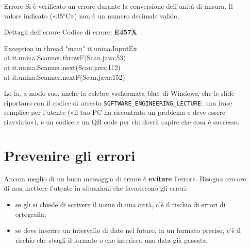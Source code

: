 \begin{center}
\begin{minipage}[t]{0.44\linewidth}\centering
  \begin{finestra}{Errore}
    Si è verificato un errore durante la conversione dell'unità di misura. Il valore indicato («35°C») non è un numero
    decimale valido.
  \end{finestra}
\end{minipage}\hspace{0.03\linewidth}\raisebox{-0.9cm}{\Large\textcolor{swteal}{$\Rightarrow$}}\hspace{0.03\linewidth}%
\begin{minipage}[t]{0.4\linewidth}\centering
  \begin{finestra}{Dettagli dell'errore}
    Codice di errore: \textbf{E457X}\par
    {\color{swred}\ttfamily\tiny Exception in thread "main" it.unina.InputEx\\
    \hspace*{1em}at it.unina.Scanner.throwF(Scan.java:53)\\
    \hspace*{1em}at it.unina.Scanner.next(Scan.java:112)\\
    \hspace*{1em}at it.unina.Scanner.nextF(Scan.java:152)}
  \end{finestra}
\end{minipage}
\end{center}

Lo fa, a modo suo, anche la celebre «schermata blu» di Windows, che le slide riportano con il codice di arresto
\texttt{SOFTWARE\_ENGINEERING\_LECTURE}: una frase semplice per l'utente («il tuo PC ha riscontrato un problema e deve
essere riavviato»), e un codice e un QR code per chi dovrà capire che cosa è successo.

\section{Prevenire gli errori}

Ancora meglio di un buon messaggio di errore è \textbf{evitare} l'errore. Bisogna cercare di non mettere l'utente in
situazioni che favoriscono gli errori:

\begin{itemize}
  \item se gli si chiede di scrivere il nome di una città, c'è il rischio di errori di ortografia;
  \item se deve inserire un intervallo di date nel futuro, in un formato preciso, c'è il rischio che sbagli il formato o
        che inserisca una data già passata.
\end{itemize}

